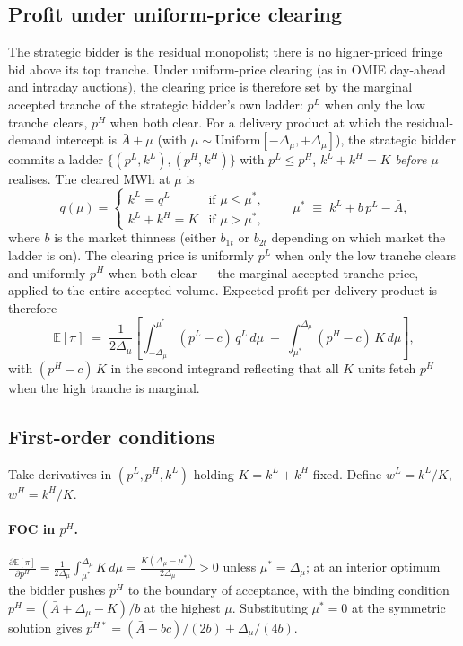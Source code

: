 \documentclass[11pt]{article}
\begin{document}
\subsection{Profit under uniform-price clearing}\label{app:tranche:profit}
The strategic bidder is the residual monopolist; there is no higher-priced fringe bid above its top tranche. Under uniform-price clearing (as in OMIE day-ahead and intraday auctions), the clearing price is therefore set by the marginal accepted tranche of the strategic bidder's own ladder: $p^L$ when only the low tranche clears, $p^H$ when both clear. For a delivery product at which the residual-demand intercept is $\bar A + \mu$ (with $\mu \sim \mathrm{Uniform}[-\Delta_\mu, +\Delta_\mu]$), the strategic bidder commits a ladder $\{(p^L, k^L), (p^H, k^H)\}$ with $p^L \le p^H$, $k^L + k^H = K$ \emph{before} $\mu$ realises. The cleared MWh at $\mu$ is
\[
q(\mu) = \begin{cases} k^L = q^L & \text{if } \mu \le \mu^*, \\ k^L + k^H = K & \text{if } \mu > \mu^*, \end{cases}
\qquad \mu^* \;\equiv\; k^L + b \, p^L - \bar A,
\]
where $b$ is the market thinness (either $b_{1t}$ or $b_{2t}$ depending on which market the ladder is on). The clearing price is uniformly $p^L$ when only the low tranche clears and uniformly $p^H$ when both clear --- the marginal accepted tranche price, applied to the entire accepted volume. Expected profit per delivery product is therefore
\begin{equation}
\mathbb{E}[\pi]
\;=\; \frac{1}{2\Delta_\mu}\!\left[\int_{-\Delta_\mu}^{\mu^*}\!(p^L - c)\,q^L\,d\mu \;+\; \int_{\mu^*}^{\Delta_\mu}\!(p^H - c)\,K\,d\mu\right],
\label{eq:Epi-uniform}
\end{equation}
with $(p^H - c)\,K$ in the second integrand reflecting that all $K$ units fetch $p^H$ when the high tranche is marginal.

\subsection{First-order conditions}\label{app:tranche:foc}
Take derivatives in $(p^L, p^H, k^L)$ holding $K = k^L + k^H$ fixed. Define $w^L = k^L/K$, $w^H = k^H/K$.

\paragraph{FOC in $p^H$.} $\frac{\partial \mathbb{E}[\pi]}{\partial p^H} = \frac{1}{2 \Delta_\mu} \int_{\mu^*}^{\Delta_\mu} K\, d\mu = \frac{K(\Delta_\mu - \mu^*)}{2\Delta_\mu} > 0$ unless $\mu^* = \Delta_\mu$; at an interior optimum the bidder pushes $p^H$ to the boundary of acceptance, with the binding condition $p^H = (\bar A + \Delta_\mu - K)/b$ at the highest $\mu$. Substituting $\mu^* = 0$ at the symmetric solution gives $p^{H*} = (\bar A + b c)/(2 b) + \Delta_\mu/(4 b)$.
\end{document}
